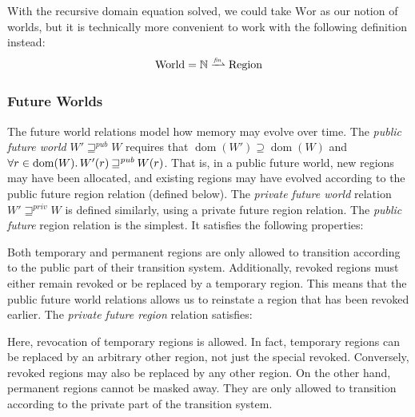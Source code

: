 \documentclass[format=acmsmall, review=true, screen=true]{acmart}
\newcommand{\finparfun}{\xrightharpoonup{\textit{\tiny{fin}}}}
\DeclareMathOperator{\dom}{dom}
\newcommand\lau[1]{{\color{purple} \sf \footnotesize {LS: #1}}\\}
\newcommand\dominique[1]{{\color{purple} \sf \footnotesize {DD: #1}}\\}
\renewcommand\lau[1]{}
\renewcommand\dominique[1]{}
\newcommand{\var}[1]{\mathit{#1}}
\newcommand{\pub}{\var{pub}}
\newcommand{\futurewk}{\mathbin{\sqsupseteq}^{\var{pub}}}
\newcommand{\futurestr}{\mathbin{\sqsupseteq}^{\var{priv}}}
\newcommand{\plaindom}[1]{\mathrm{#1}}
\newcommand{\nats}{\mathbb{N}}
\newcommand{\Regions}{\plaindom{Region}}
\newcommand{\Worlds}{\plaindom{World}}
\newcommand{\Wor}{\plaindom{Wor}}
\newcommand{\plainview}[1]{\mathrm{#1}}
\newcommand{\temp}{\plainview{temp}}
\newcommand{\revoked}{\plainview{revoked}}
\begin{document}
With the recursive domain equation solved, we could take $\Wor$ as our notion of
worlds, but it is technically more convenient to work with the following
definition instead:
\[
  \Worlds = \nats \finparfun \Regions
\]

\subsubsection{Future Worlds}
\label{subsec:future-worlds} 
The future world relations model how memory may evolve over time. 
The \emph{public future world} $W' \futurewk W$ requires that $\dom(W') \supseteq
\dom(W)$ and $\forall r \in \dom(W) \ldotp W'(r) \futurewk W(r)$. That is, in a
public future world, new regions may have been allocated, and existing regions
may have evolved according to the public future region relation (defined below).
The \emph{private future world} relation $W' \futurestr W$ is defined similarly,
using a private future region relation. The \emph{public future} region relation is the simplest. It satisfies
the following properties:
Both temporary and permanent regions are only allowed to transition according to
the public part of their transition system. Additionally, revoked regions must
either remain revoked or be replaced by a temporary region. This means that the
public future world relations allows us to reinstate a region that has been revoked
earlier. The \emph{private future region} relation satisfies:
Here, revocation of temporary regions is allowed. In fact, temporary regions can
be replaced by an arbitrary other region, not just the special $\revoked$.
Conversely, $\revoked$ regions may also be replaced by any other region. On
the other hand, permanent regions cannot be masked away. They are only allowed
to transition according to the private part of the transition system.
\end{document}
